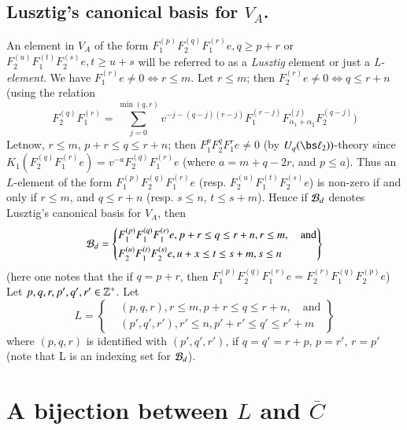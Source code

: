 \subsection{Lusztig's canonical basis for \boldmath$V_{A}$.}\label{chap9-subsec-4.9}
An element in $V_{A}$ of the form $F_{1}^{(p)} F_{2}^{(q)}F_{1}^{(r)}e, q\geq p+r$ or $F_{2}^{(u)} F_{1}^{(t)}F_{2}^{(s)} e, t\geq u + s$ will be referred to as a \textit{Lusztig} element or just a \textit{L-element}. We have $F_{1}^{(r)} e \neq 0 \Longleftrightarrow r \leq m$. Let $r \leq m$; then $F_{2}^{(r)} e \neq 0 \Longleftrightarrow q \leq r + n$ (using the relation
$$
F_{2}^{(q)}F_{1}^{(r)} = \sum\limits_{j=0}^{\min(q,r)} v^{-j-(q-j)(r-j)}F_{1}^{(r-j)}F_{\alpha_{1}+ \alpha_{2}}^{(j)} F_{2}^{(q-j)})
$$
Let\pageoriginale now, $r \leq m$, $p+r \leq q \leq r +n$; then $F_{1}^{p} F_{2}^{q}F_{1}^{r} e \neq 0$ (by $U_{q}(\bs\ell_{2}))$-theory since $K_{1}(F_{2}^{(q)}F_{1}^{(r)}e) = v^{-a}F_{2}^{(q)}F_{1}^{(r)} e$ (where $a=m+q-2r$, and $ p\leq a$). Thus an $L$-element of the form $F_{1}^{(p)}F_{2}^{(q)}F_{1}^{(r)}e$ (resp. $F_{2}^{(u)}F_{1}^{(t)}F_{2}^{(s)}e$) is non-zero if and only if $r\leq m$, and $q \leq r+n$ (resp. $s \leq n$, $t \leq s+m$). Hence if $\mathcal{B}_{d}$ denotes Lusztig's canonical basis for $V_{A}$, then
\begin{equation*}
\mathcal{B}_{d}= \left\{
\begin{aligned}
&F_{1}^{(p)} F_{1}^{(q)} F_{1}^{(r)} e, p+r \leq q \leq r + n, r \leq m,\quad  \text{and}\\
&F_{2}^{(u)} F_{1}^{(t)} F_{2}^{(s)} e, u+x\leq t \leq s + m, s \leq n
\end{aligned}
\right\}
 \end{equation*}
(here one notes that the if $q=p+r$, then $F_{1}^{(p)} F_{2}^{(q)} F_{1}^{(r)} e = F_{2}^{(r)} F_{1}^{(q)} F_{2}^{(p)}e$) Let $p, q, r, p', q', r' \in \mathbb{Z}^{+}$. Let
\begin{equation*}
L=\left\{
\begin{aligned}
&(p,q,r), r \leq m, p+r \leq q \leq r + n, \quad \text{and}\\
&(p',q',r'), r' \leq n, p'+r' \leq q' \leq r' + m
\end{aligned}
\right\}
\end{equation*}
where $(p,q,r)$ is identified with $(p',q', r')$, if $q= q' = r + p$, $p= r'$, $r=p'$ (note that L is an indexing set for $\mathcal{B}_{d}$).

\section{A bijection between $L$ and  $\overline{C}$}\label{chap9-sec-5}

